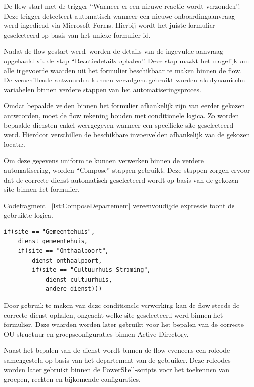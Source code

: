 De flow start met de trigger ``Wanneer er een nieuwe reactie wordt verzonden''. Deze trigger detecteert automatisch wanneer een nieuwe onboardingaanvraag werd ingediend via Microsoft Forms. Hierbij wordt het juiste formulier geselecteerd op basis van het unieke formulier-id.

Nadat de flow gestart werd, worden de details van de ingevulde aanvraag opgehaald via de stap ``Reactiedetails ophalen''. Deze stap maakt het mogelijk om alle ingevoerde waarden uit het formulier beschikbaar te maken binnen de flow. De verschillende antwoorden kunnen vervolgens gebruikt worden als dynamische variabelen binnen verdere stappen van het automatiseringsproces.

Omdat bepaalde velden binnen het formulier afhankelijk zijn van eerder gekozen antwoorden, moet de flow rekening houden met conditionele logica. Zo worden bepaalde diensten enkel weergegeven wanneer een specifieke site geselecteerd werd. Hierdoor verschillen de beschikbare invoervelden afhankelijk van de gekozen locatie.

Om deze gegevens uniform te kunnen verwerken binnen de verdere automatisering, worden ``Compose''-stappen gebruikt. Deze stappen zorgen ervoor dat de correcte dienst automatisch geselecteerd wordt op basis van de gekozen site binnen het formulier.

Codefragment ~\ref{lst:ComposeDepartement} vereenvoudigde expressie toont de gebruikte logica.

\begin{listing}[ht]
\caption{Samenstelling van de departementen}
\label{lst:ComposeDepartement}
\begin{verbatim}
if(site == "Gemeentehuis",
    dienst_gemeentehuis,
    if(site == "Onthaalpoort",
        dienst_onthaalpoort,
        if(site == "Cultuurhuis Stroming",
            dienst_cultuurhuis,
            andere_dienst)))
\end{verbatim}
\end{listing}

Door gebruik te maken van deze conditionele verwerking kan de flow steeds de correcte dienst ophalen, ongeacht welke site geselecteerd werd binnen het formulier. Deze waarden worden later gebruikt voor het bepalen van de correcte OU-structuur en groepsconfiguraties binnen Active Directory.

Naast het bepalen van de dienst wordt binnen de flow eveneens een rolcode samengesteld op basis van het departement van de gebruiker. Deze rolcodes worden later gebruikt binnen de PowerShell-scripts voor het toekennen van groepen, rechten en bijkomende configuraties.

